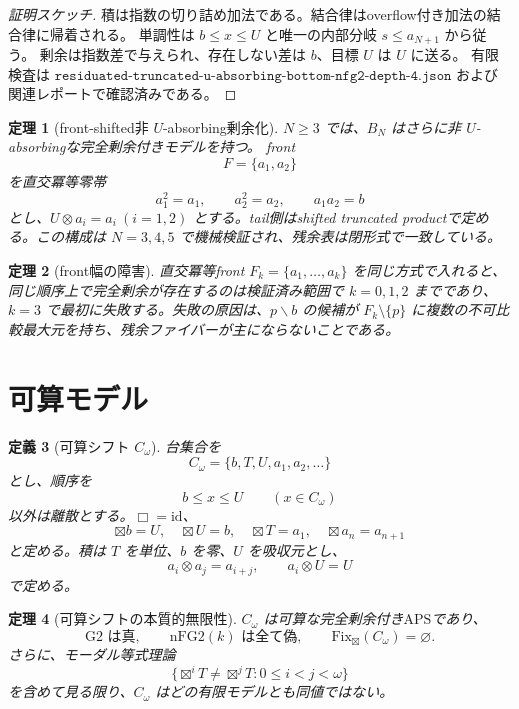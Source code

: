 \documentclass[uplatex,dvipdfmx,a4paper,10pt]{jsarticle}
\newtheorem{theorem}{定理}
\newtheorem{definition}[theorem]{定義}
\newcommand{\APS}{\mathrm{APS}}
\newcommand{\Gtwo}{\mathrm{G2}}
\newcommand{\nFGtwo}{\mathrm{nFG2}}
\newcommand{\Fix}{\mathrm{Fix}}
\newcommand{\bt}{\boxtimes}
\newcommand{\resl}{\backslash}
\begin{document}
\begin{proof}[証明スケッチ]
積は指数の切り詰め加法である。結合律はoverflow付き加法の結合律に帰着される。
単調性は \(b\le x\le U\) と唯一の内部分岐 \(s\le a_{N+1}\) から従う。
剰余は指数差で与えられ、存在しない差は \(b\)、目標 \(U\) は \(U\) に送る。
有限検査は \(\texttt{residuated-truncated-u-absorbing-bottom-nfg2-depth-4.json}\)
および関連レポートで確認済みである。
\end{proof}

\begin{theorem}[front-shifted非 \(U\)-absorbing剰余化]
\(N\ge3\) では、\(B_N\) はさらに非 \(U\)-absorbingな完全剰余付きモデルを持つ。
front
\[
F=\{a_1,a_2\}
\]
を直交冪等零帯
\[
a_1^2=a_1,\qquad a_2^2=a_2,\qquad a_1a_2=b
\]
とし、\(U\otimes a_i=a_i\ (i=1,2)\) とする。tail側はshifted truncated
productで定める。この構成は \(N=3,4,5\) で機械検証され、残余表は閉形式で一致している。
\end{theorem}

\begin{theorem}[front幅の障害]
直交冪等front \(F_k=\{a_1,\ldots,a_k\}\) を同じ方式で入れると、
同じ順序上で完全剰余が存在するのは検証済み範囲で \(k=0,1,2\) までであり、
\(k=3\) で最初に失敗する。失敗の原因は、\(p\resl b\) の候補が
\(F_k\setminus\{p\}\) に複数の不可比較最大元を持ち、残余ファイバーが主にならないことである。
\end{theorem}

\section{可算モデル}

\begin{definition}[可算シフト \(C_\omega\)]
台集合を
\[
C_\omega=\{b,T,U,a_1,a_2,\ldots\}
\]
とし、順序を
\[
b\le x\le U\qquad(x\in C_\omega)
\]
以外は離散とする。\(\Box=\mathrm{id}\)、
\[
\bt b=U,\quad \bt U=b,\quad \bt T=a_1,\quad \bt a_n=a_{n+1}
\]
と定める。積は \(T\) を単位、\(b\) を零、\(U\) を吸収元とし、
\[
a_i\otimes a_j=a_{i+j},\qquad a_i\otimes U=U
\]
で定める。
\end{definition}

\begin{theorem}[可算シフトの本質的無限性]
\(C_\omega\) は可算な完全剰余付き\(\APS\)であり、
\[
\Gtwo \text{ は真},\qquad
\nFGtwo(k) \text{ は全て偽},\qquad
\Fix_{\bt}(C_\omega)=\varnothing.
\]
さらに、モーダル等式理論
\[
\{\bt^iT\ne \bt^jT:0\le i<j<\omega\}
\]
を含めて見る限り、\(C_\omega\) はどの有限モデルとも同値ではない。
\end{theorem}
\end{document}
